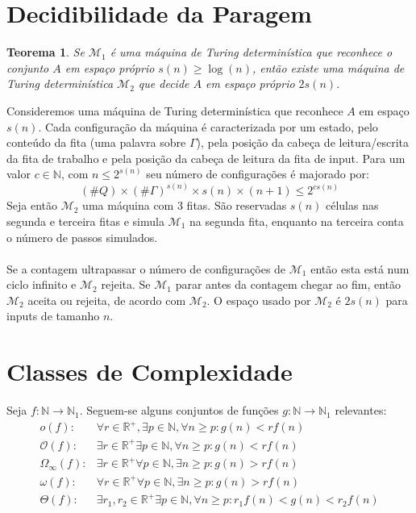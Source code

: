 \documentclass[10pt,a4paper]{report}
\newtheorem{theorem}{Teorema}
\begin{document}
\section{Decidibilidade da Paragem}
\begin{theorem}
Se $\mathcal{M}_1$ é uma máquina de Turing determinística que reconhece o conjunto $A$ em espaço próprio $s(n) \geq \log(n)$, então existe uma máquina de Turing determinística $\mathcal{M}_2$ que decide $A$ em espaço próprio $2s(n)$.
\end{theorem}
Consideremos uma máquina de Turing determinística que reconhece $A$ em espaço $s(n)$. Cada configuração da máquina é caracterizada por um estado, pelo conteúdo da fita (uma palavra sobre $\Gamma$), pela posição da cabeça de leitura/escrita da fita de trabalho e pela posição da cabeça de leitura da fita de input. Para um valor $c\in \mathbb{N}$, com $n \leq 2^{s(n)}$ seu número de configurações é majorado por:
$$
(\#Q) \times (\#\Gamma)^{s(n)} \times s(n) \times (n + 1) \leq 2^{cs(n)}
$$
Seja então $\mathcal{M}_2$ uma máquina com 3 fitas. São reservadas $s(n)$ células nas segunda e terceira fitas e simula $\mathcal{M}_1$ na segunda fita, enquanto na terceira conta o número de passos simulados.\\
\\
Se a contagem ultrapassar o número de configurações de $\mathcal{M}_1$ então esta está num ciclo infinito e $\mathcal{M}_2$ rejeita. Se $\mathcal{M}_1$ parar antes da contagem chegar ao fim, então $\mathcal{M}_2$ aceita ou rejeita, de acordo com $\mathcal{M}_2$. O espaço usado por $\mathcal{M}_2$ é $2s(n)$ para inputs de tamanho $n$.

\section{Classes de Complexidade}
Seja $f: \mathbb{N} \rightarrow \mathbb{N}_1$. Seguem-se alguns conjuntos de funções $g: \mathbb{N} \rightarrow \mathbb{N}_1$ relevantes:
\begin{align}
o(f):& \forall r \in \mathbb{R}^+, \exists p \in \mathbb{N}, \forall n \geq p: g(n) < r f(n)\\
\mathcal{O}(f):& \exists r \in \mathbb{R}^+ \exists p \in \mathbb{N}, \forall n \geq p: g(n) < r f(n)\\
\Omega_\infty(f):& \exists r \in \mathbb{R}^+ \forall p \in \mathbb{N}, \exists n \geq p: g(n) > r f(n)\\
\omega(f):& \forall r \in \mathbb{R}^+ \forall p \in \mathbb{N}, \exists n \geq p: g(n) > r f(n)\\
\Theta(f):& \exists r_1,r_2 \in \mathbb{R}^+ \exists p \in \mathbb{N}, \forall n \geq p: r_1f(n) < g(n) < r_2f(n)
\end{align}
\end{document}
